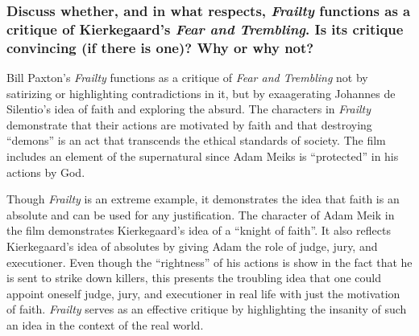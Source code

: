 \documentclass{article}
\begin{document}
\subsubsection*{Discuss whether, and in what respects, \textit{Frailty} functions as a critique of Kierkegaard's \textit{Fear and Trembling}. Is its critique convincing (if there is one)? Why or why not?}
Bill Paxton's \textit{Frailty} functions as a critique of \textit{Fear and Trembling} not by satirizing or highlighting contradictions in it, but by exaagerating Johannes de Silentio's idea of faith and exploring the absurd. The characters in \textit{Frailty} demonstrate that their actions are motivated by faith and that destroying ``demons'' is an act that transcends the ethical standards of society. The film includes an element of the supernatural since Adam Meiks is ``protected'' in his actions by God. \par
Though \textit{Frailty} is an extreme example, it demonstrates the idea that faith is an absolute and can be used for any justification. The character of Adam Meik in the film demonstrates Kierkegaard's idea of a ``knight of faith''. It also reflects Kierkegaard's idea of absolutes by giving Adam the role of judge, jury, and executioner. Even though the ``rightness'' of his actions is show in the fact that he is sent to strike down killers, this presents the troubling idea that one could appoint oneself judge, jury, and executioner in real life with just the motivation of faith. \textit{Frailty} serves as an effective critique by highlighting the insanity of such an idea in the context of the real world.
\end{document}
